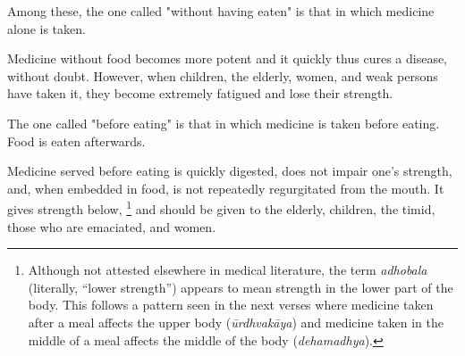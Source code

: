 \begin{translation}
\item[86]
Among these, %
the one called "without having eaten" is that in which %
medicine alone is taken.

\item[87]
Medicine without food becomes more potent and it quickly thus cures a disease, without doubt. %
However, when children, the elderly, women, and weak persons have taken it, %
they become extremely fatigued and lose their strength. 

\item[88]
The one called "before eating" is that in which medicine is taken before eating. %
Food is eaten afterwards. %

\item[89] %
Medicine served before eating %
is quickly digested, %
does not impair one's strength, %
and, when embedded in food, %
is not repeatedly %
regurgitated from the mouth.
It gives strength below,%
    \footnote{Although not attested elsewhere in medical literature, the term \emph{adhobala} (literally, ``lower strength'') appears to mean strength in the lower part of the body. This follows a pattern seen in the next verses where medicine taken after a meal affects the upper body (\emph{ūrdhvakāya}) and medicine taken in the middle of a meal affects the middle of the body (\emph{dehamadhya}).}
and should be given to the elderly, children, the timid, those who are emaciated, and women.   


\end{translation}
